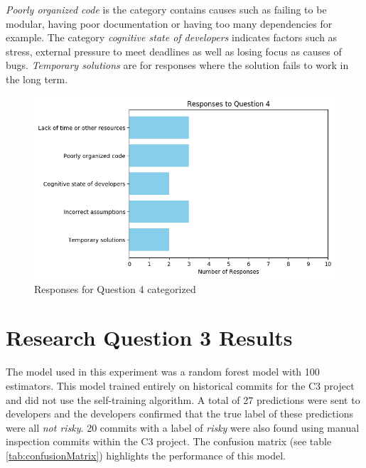 \documentclass[../main.tex]{subfiles}
\begin{document}
\textit{Poorly organized code} is the category contains causes such as failing to be modular, having poor documentation or having too many dependencies for example. The category \textit{cognitive state of developers} indicates factors such as stress, external pressure to meet deadlines as well as losing focus as causes of bugs. \textit{Temporary solutions} are for responses where the solution fails to work in the long term. 

\begin{figure}[H]
    \centering
    \includegraphics[scale=0.7]{images/Results/RQ2/RQ2_question_4.png}
    \caption{Responses for Question 4 categorized}
    \label{fig:rq2Image4}
\end{figure}

\section{Research Question 3 Results}\label{section:rq3exp}

The model used in this experiment was a random forest model with 100 estimators. This model trained entirely on historical commits for the C3 project and did not use the self-training algorithm. A total of 27 predictions were sent to developers and the developers confirmed that the true label of these predictions were all \textit{not risky}. 20 commits with a label of \textit{risky} were also found using manual inspection commits within the C3 project. The confusion matrix (see table \ref{tab:confusionMatrix}) highlights the performance of this model. 
\end{document}
